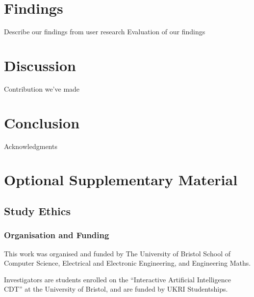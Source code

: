 \documentclass[manuscript,screen,review]{acmart}
\begin{document}
\section{Findings}
Describe our findings from user research
Evaluation of our findings

\section{Discussion}
Contribution we've made


\section{Conclusion}



\begin{acks}
Acknowledgments
\end{acks}

\newpage



\appendix

\section{Optional Supplementary Material}

\subsection{Study Ethics}

\subsubsection{Organisation and Funding}


This work was organised and funded by The University of Bristol School of Computer Science, Electrical and Electronic Engineering, and Engineering Maths.

Investigators are students enrolled on the “Interactive Artificial Intelligence CDT” at the University of Bristol, and are funded by UKRI Studentships.
\end{document}
